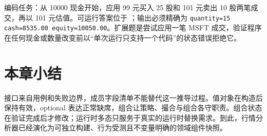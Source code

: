 编码任务：从 10000 现金开始，应用 99 元买入 25 股和 101 元卖出 10 股两笔成交，再以 101 元估值。可运行答案位于 ；输出必须精确为 \texttt{quantity=15 cash=8535.00 equity=10050.00}。扩展题是尝试应用一笔 MSFT 成交，验证程序在任何现金或数量改变前以“单次运行只支持一个代码”的状态错误拒绝它。


\section{本章小结}

接口来自用例和失败边界，成员字段清单不能替代这一推导过程。值对象在构造后保持有效，optional 表达正常缺席，组合让策略、撮合与组合各守职责。组合状态在验证完成后才修改；运行时多态只服务于真实的运行时替换需求。到此，行情分析器已经演化为可独立构建、行为受测且不变量明确的领域组件快照。
